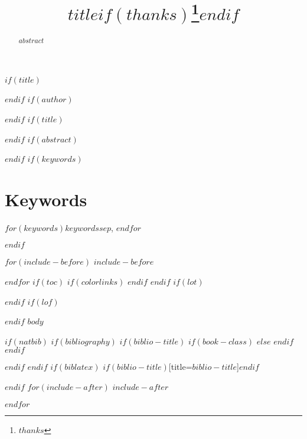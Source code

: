 \documentclass[$if(fontsize)$$fontsize$,$endif$$if(lang)$$babel-lang$,$endif$$if(papersize)$$papersize$paper,$endif$$for(classoption)$$classoption$$sep$,$endfor$]{$documentclass$}
\begin{document}
\pagestyle{front}

$if(title)$
\title{$title$$if(thanks)$\thanks{$thanks$}$endif$}

$endif$
$if(author)$

$endif$
$if(title)$
\maketitle
\thispagestyle{front}

$endif$
$if(abstract)$
\begin{abstract}
$abstract$
\end{abstract}

$endif$
$if(keywords)$
\section*{Keywords}
$for(keywords)$$keywords$$sep$, $endfor$

$endif$

\clearpage
\pagestyle{main}

$for(include-before)$
$include-before$

$endfor$
$if(toc)$
{
$if(colorlinks)$
\hypersetup{linkcolor=$if(toccolor)$$toccolor$$else$black$endif$}
$endif$
\setcounter{tocdepth}{$toc-depth$}
\tableofcontents
}
$endif$
$if(lot)$
\listoftables
$endif$
$if(lof)$
\listoffigures
$endif$
$body$

$if(natbib)$
$if(bibliography)$
$if(biblio-title)$
$if(book-class)$
\renewcommand\bibname{$biblio-title$}
$else$
\renewcommand\refname{$biblio-title$}
$endif$
$endif$
{\small}

$endif$
$endif$
$if(biblatex)$
\printbibliography$if(biblio-title)$[title=$biblio-title$]$endif$

$endif$
$for(include-after)$
$include-after$

$endfor$
\end{document}
